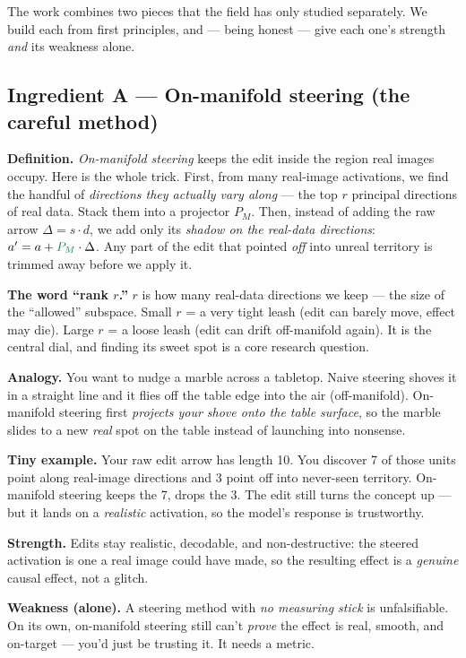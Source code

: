 \documentclass[12pt]{article}
\newcommand{\dlabel}[1]{\textbf{\textcolor{accent}{#1}}\;}
\newcommand{\onm}[1]{\textcolor{onman}{#1}}
\begin{document}
The work combines two pieces that the field has only studied separately. We build each from first principles, and --- being honest --- give each one's strength \emph{and} its weakness alone.

\subsection{Ingredient A --- On-manifold steering (the careful method)}

\dlabel{Definition.} \emph{On-manifold steering} keeps the edit inside the region real images occupy. Here is the whole trick. First, from many real-image activations, we find the handful of \emph{directions they actually vary along} --- the top \onm{$r$} principal directions of real data. Stack them into a projector \onm{$P_M$}. Then, instead of adding the raw arrow $\Delta = s\cdot d$, we add only its \emph{shadow on the real-data directions}: $a' = a + \onm{P_M}\cdot\Delta$. Any part of the edit that pointed \emph{off} into unreal territory is trimmed away before we apply it.

\dlabel{The word ``rank $r$.''} \emph{$r$} is how many real-data directions we keep --- the size of the ``allowed'' subspace. Small $r$ = a very tight leash (edit can barely move, effect may die). Large $r$ = a loose leash (edit can drift off-manifold again). It is the central dial, and finding its sweet spot is a core research question.

\dlabel{Analogy.} You want to nudge a marble across a tabletop. Naive steering shoves it in a straight line and it flies off the table edge into the air (off-manifold). On-manifold steering first \emph{projects your shove onto the table surface}, so the marble slides to a new \emph{real} spot on the table instead of launching into nonsense.

\dlabel{Tiny example.} Your raw edit arrow has length 10. You discover 7 of those units point along real-image directions and 3 point off into never-seen territory. On-manifold steering keeps the 7, drops the 3. The edit still turns the concept up --- but it lands on a \emph{realistic} activation, so the model's response is trustworthy.

\dlabel{Strength.} Edits stay realistic, decodable, and non-destructive: the steered activation is one a real image could have made, so the resulting effect is a \emph{genuine} causal effect, not a glitch.

\dlabel{Weakness (alone).} A steering method with \emph{no measuring stick} is unfalsifiable. On its own, on-manifold steering still can't \emph{prove} the effect is real, smooth, and on-target --- you'd just be trusting it. It needs a metric.
\end{document}
